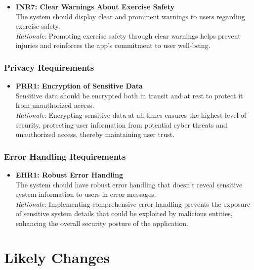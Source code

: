 \documentclass[12pt]{article}
\begin{document}
\begin{itemize}
    \item \textbf{INR7: Clear Warnings About Exercise Safety}\\
    The system should display clear and prominent warnings to users regarding exercise safety.\\
    \textit{Rationale:} Promoting exercise safety through clear warnings helps prevent injuries and reinforces the app’s commitment to user well-being.
\end{itemize}


\subsubsection{Privacy Requirements}

\begin{itemize}
    \item \textbf{PRR1: Encryption of Sensitive Data}\\
    Sensitive data should be encrypted both in transit and at rest to protect it from unauthorized access.\\
    \textit{Rationale:} Encrypting sensitive data at all times ensures the highest level of security, protecting user information from potential cyber threats and unauthorized access, thereby maintaining user trust.
\end{itemize}

\subsubsection{Error Handling Requirements}

\begin{itemize}
    \item \textbf{EHR1: Robust Error Handling}\\
    The system should have robust error handling that doesn't reveal sensitive system information to users in error messages.\\
    \textit{Rationale:} Implementing comprehensive error handling prevents the exposure of sensitive system details that could be exploited by malicious entities, enhancing the overall security posture of the application.
\end{itemize}

\section{Likely Changes}
\end{document}

